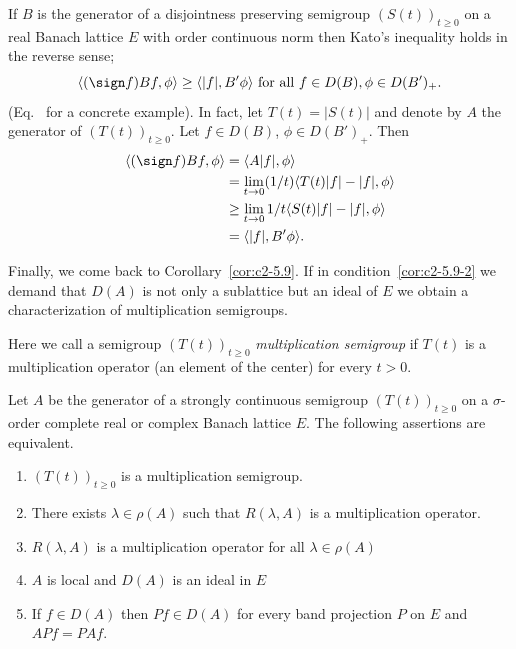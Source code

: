 \begin{remark}\label{rem:c2-5.12}
%
If\/ $B$ is the generator of a disjointness preserving semigroup $(S(t))_{t \geq 0}$ on a real Banach lattice $E$ with order continuous norm then Kato's inequality holds in the reverse sense; \ie
\[
\langle(\sign  f)Bf,\phi \rangle \geq \langle |f|, B'\phi \rangle \text{ for all } f \in D(B), \phi \in D(B')_{+}.
\]
(\cf Eq.~ for a concrete example). 
In fact, let $T(t) = |S(t)|$ and denote by $A$ the generator of\/ $(T(t))_{t \geq 0}$. 
Let $f \in D(B)$, $\phi \in D(B')_{+}$.
Then 
\begin{align*}
\langle(\sign  f)Bf,\phi \rangle &= \langle A|f|,\phi \rangle \\
 &= \lim_{t \to 0} (1/t) \langle T(t)|f| - |f|, \phi \rangle \\
 &\geq \lim_{t \to 0} 1/t \langle S(t)|f| - |f|, \phi \rangle \\
 &= \langle |f|, B'\phi \rangle.
\end{align*}
\end{remark}

Finally, we come back to Corollary~\ref{cor:c2-5.9}.
If in condition~\ref{cor:c2-5.9-2}   we demand that $D(A)$ is not only a sublattice but an ideal of\/ $E$ we obtain a characterization of multiplication semigroups.

Here we call a semigroup $(T(t))_{t \geq 0}$ \emph{multiplication semigroup} if\/ $T(t)$ is a multiplication operator (\ie an element of the center) for every $t > 0$.

\begin{theorem}\label{thm:c2-5.13}
%
Let $A$ be the generator of a strongly continuous semigroup $(T(t))_{t \geq 0}$ on a $\sigma$-order complete real or complex Banach lattice $E$.
The following assertions are equivalent.
\begin{enumerate}[\upshape (a)]
\item \label{thm:c2-5.13-1}
$(T(t))_{t \geq 0}$ is a multiplication semigroup.
\item \label{thm:c2-5.13-2}
There exists $\lambda \in \rho(A)$ such that $R(\lambda,A)$ is a multiplication operator.
\item \label{thm:c2-5.13-3}
$R(\lambda,A)$ is a multiplication operator for all $\lambda \in \rho(A)$
\item \label{thm:c2-5.13-4}
$A$ is local and $D(A)$ is an ideal in $E$
\item \label{thm:c2-5.13-5}
If\/ $f \in D(A)$ then $Pf \in D(A)$ for every band projection $P$ on $E$ and $APf = PAf$.
\end{enumerate}
\end{theorem}

